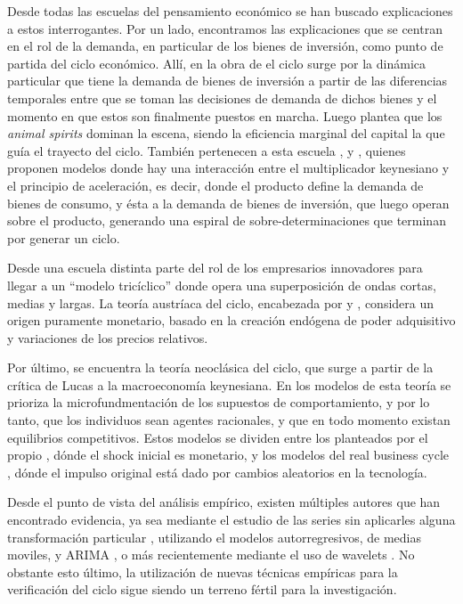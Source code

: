 \documentclass[a4paper]{article}
\begin{document}
Desde todas las escuelas del pensamiento económico se han buscado explicaciones a estos interrogantes. Por un lado, encontramos las explicaciones que se centran en el rol de la demanda, en particular de los bienes de inversión, como punto de partida del ciclo económico. Allí, en la obra de \cite{kalecki2013essays} el ciclo surge por la dinámica particular que tiene la demanda de bienes de inversión a partir de las diferencias temporales entre que se toman las decisiones de demanda de dichos bienes y el momento en que estos son finalmente puestos en marcha. Luego \cite{keynes2018general} plantea que los \textit{animal spirits} dominan la escena, siendo la eficiencia marginal del capital la que guía el trayecto del ciclo. También pertenecen a esta escuela \cite{harrod1936trade}, \cite{kaldor1940model} y \cite{samuelson1939synthesis}, quienes proponen modelos donde hay una interacción entre el multiplicador keynesiano y el principio de aceleración, es decir, donde el producto define la demanda de bienes de consumo, y ésta a la demanda de bienes de inversión, que luego operan sobre el producto, generando una espiral de sobre-determinaciones que terminan por generar un ciclo. 

Desde una escuela distinta \cite{schumpeter1939business} parte del rol de los empresarios innovadores para llegar a un “modelo tricíclico” donde opera una superposición de ondas cortas, medias y largas. 
La teoría austríaca del ciclo, encabezada por \cite{hayek1933} y \cite{von1943elastic}, considera un origen puramente monetario, basado en la creación endógena de poder adquisitivo y variaciones de los precios relativos. 

Por último, se encuentra la teoría neoclásica del ciclo, que surge a partir de la crítica de Lucas a la macroeconomía keynesiana. En los modelos de esta teoría se prioriza la microfundmentación de los supuestos de comportamiento, y por lo tanto, que los individuos sean agentes racionales, y que en todo momento existan equilibrios competitivos. Estos modelos se dividen entre los planteados por el propio \cite{lucas1975equilibrium}, dónde el shock inicial es monetario, y los modelos del real business cycle \citep{plosser1989understanding}, dónde el impulso original está dado por cambios aleatorios en la tecnología.

Desde el punto de vista del análisis empírico, existen múltiples autores que han encontrado evidencia, ya sea mediante el estudio de las series sin aplicarles alguna transformación particular \citep{kuznets1930secular,kondratieff1979long,schumpeter1939business}, utilizando el modelos autorregresivos, de medias moviles, y ARIMA \citep{hamilton1989new,kaiser2012measuring}, o más recientemente mediante el uso de wavelets \citep{yogo2008measuring,soares2011business}. No obstante esto último, la utilización de nuevas técnicas empíricas para la verificación del ciclo sigue siendo un terreno fértil para la investigación.
\end{document}
